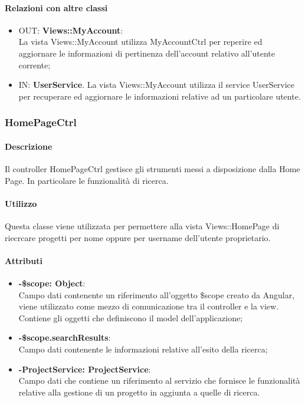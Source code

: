 	\paragraph{Relazioni con altre classi}
	\begin{itemize}
	  \item OUT: \textbf{Views::MyAccount}:\\
		La vista Views::MyAccount utilizza MyAccountCtrl per reperire ed aggiornare le informazioni di pertinenza dell'account relativo all'utente corrente;	
	   \item IN: \textbf{UserService}.
	  	La vista Views::MyAccount utilizza il service UserService per recuperare ed aggiornare le informazioni relative ad un particolare utente.	
	  		
	\end{itemize}		

\newpage
\subsubsection{HomePageCtrl}
	\paragraph{Descrizione}
	Il controller HomePageCtrl gestisce gli strumenti messi a disposizione dalla Home Page. In particolare le funzionalità di ricerca.
	
	\paragraph{Utilizzo}
	Questa classe viene utilizzata per permettere alla vista Views::HomePage di riecrcare progetti per nome oppure per username dell'utente proprietario.\\
	\paragraph{Attributi}
	\begin{itemize}
		\item \textbf{-\$scope: Object}:\\
			Campo dati contenente un riferimento all'oggetto \$scope creato da Angular, viene utilizzato come mezzo di comunicazione tra il controller e la view. Contiene gli oggetti che definiscono il model dell'applicazione;	
		\item \textbf{-\$scope.searchResults}:\\
			Campo dati contenente le informazioni relative all'esito della ricerca;
				
		\item \textbf{-ProjectService: ProjectService}:\\
			Campo dati che contiene un riferimento al servizio che fornisce le funzionalità relative alla gestione di un progetto in aggiunta a quelle di ricerca.
	
	\end{itemize}
	
